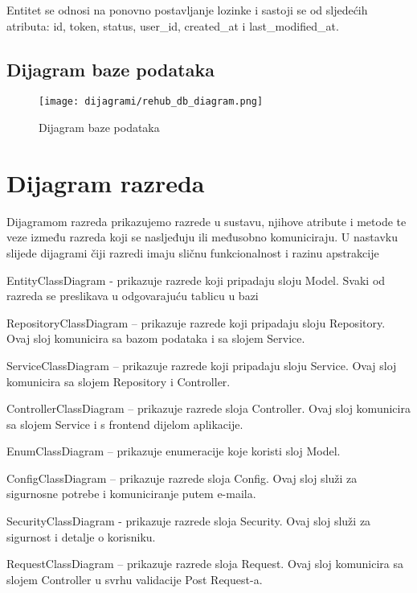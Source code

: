 Entitet se odnosi na ponovno postavljanje lozinke i sastoji se od sljedećih atributa: id, token, status, user\_id, created\_at i last\_modified\_at.





\subsection{Dijagram baze podataka}

\begin{figure}[H]
	\texttt{[image: dijagrami/rehub\_db\_diagram.png]}
	\centering
	\caption{Dijagram baze podataka}
	\label{fig:dbDiagram}
\end{figure}

\eject


\section{Dijagram razreda}

Dijagramom razreda prikazujemo razrede u sustavu, njihove atribute i metode te veze između razreda koji se nasljeđuju ili međusobno komuniciraju. U nastavku slijede dijagrami čiji razredi imaju sličnu funkcionalnost i razinu apstrakcije

EntityClassDiagram - prikazuje razrede koji pripadaju sloju Model. Svaki od razreda se preslikava u odgovarajuću tablicu u bazi

RepositoryClassDiagram – prikazuje razrede koji pripadaju sloju Repository. Ovaj sloj komunicira sa bazom podataka i sa slojem Service.

ServiceClassDiagram – prikazuje razrede koji pripadaju sloju Service. Ovaj sloj komunicira sa slojem Repository i Controller.

ControllerClassDiagram – prikazuje razrede sloja Controller. Ovaj sloj komunicira sa slojem Service i s frontend dijelom aplikacije.

EnumClassDiagram – prikazuje enumeracije koje koristi sloj Model.

ConfigClassDiagram – prikazuje razrede sloja Config. Ovaj sloj služi za sigurnosne potrebe i komuniciranje putem e-maila.

SecurityClassDiagram - prikazuje razrede sloja Security. Ovaj sloj služi za sigurnost i detalje o korisniku.

RequestClassDiagram – prikazuje razrede sloja Request. Ovaj sloj komunicira sa slojem Controller u svrhu validacije Post Request-a.

